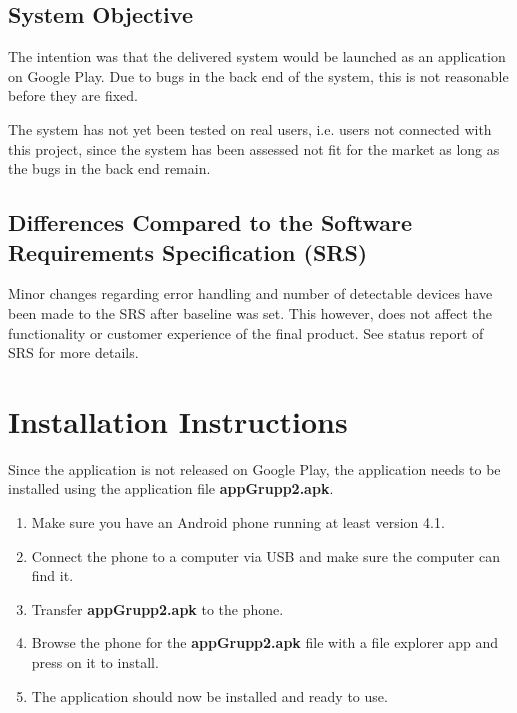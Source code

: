 \documentclass[a4paper]{article}
\begin{document}
\subsection{System Objective}
The intention was that the delivered system would be launched as an application on Google Play. Due to bugs in the back end of the system, this is not reasonable before they are fixed. 

The system has not yet been tested on real users, i.e. users not connected with this project, since the system has been assessed not fit for the market as long as the bugs in the back end remain.  

\subsection{Differences Compared to the Software Requirements Specification (SRS)}
Minor changes regarding error handling and number of detectable devices have been made to the SRS after baseline was set. This however, does not affect the functionality or customer experience of the final product. See status report of SRS for more details. 


\section{Installation Instructions}
Since the application is not released on Google Play, the application needs to be installed using the application file \textbf{appGrupp2.apk}. 

\begin{enumerate}
\item Make sure you have an Android phone running at least version 4.1.
\item Connect the phone to a computer via USB and make sure the computer can find it.
\item Transfer \textbf{appGrupp2.apk} to the phone.
\item Browse the phone for the \textbf{appGrupp2.apk} file with a file explorer app and press on it to install.
\item The application should now be installed and ready to use.
\end{enumerate}
\end{document}
